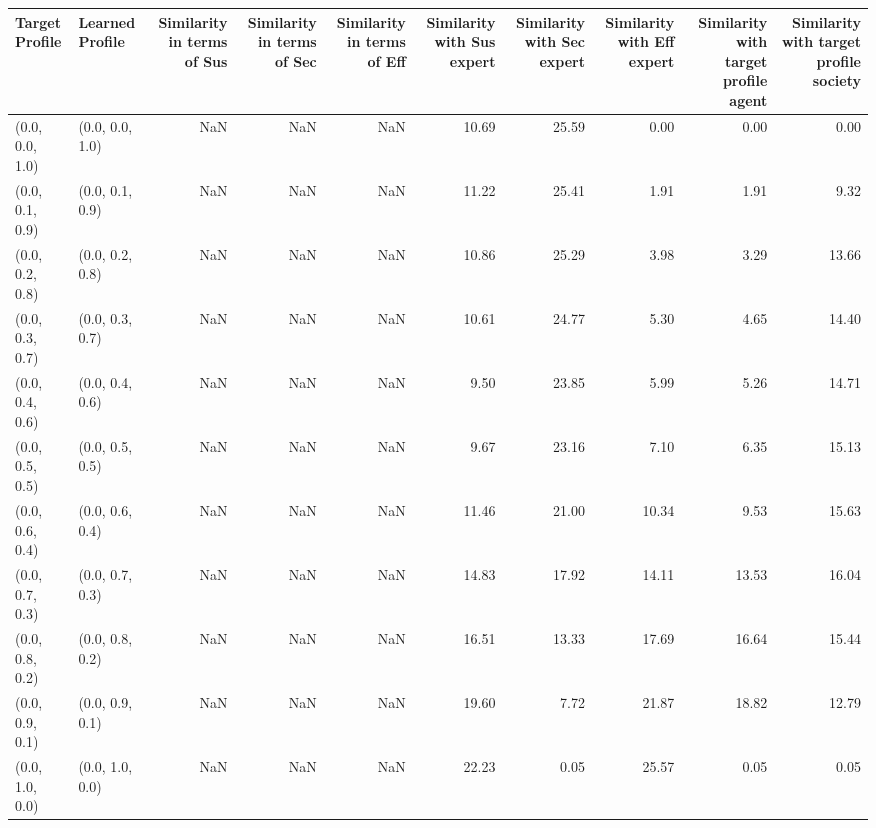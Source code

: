 \begin{tabular}{llrrrrrrrr}
\toprule
Target Profile & Learned Profile & Similarity in terms of Sus & Similarity in terms of Sec & Similarity in terms of Eff & Similarity with Sus expert & Similarity with Sec expert & Similarity with Eff expert & Similarity with target profile agent & Similarity with target profile society \\
\midrule
(0.0, 0.0, 1.0) & (0.0, 0.0, 1.0) & NaN & NaN & NaN & 10.69 & 25.59 & 0.00 & 0.00 & 0.00 \\
(0.0, 0.1, 0.9) & (0.0, 0.1, 0.9) & NaN & NaN & NaN & 11.22 & 25.41 & 1.91 & 1.91 & 9.32 \\
(0.0, 0.2, 0.8) & (0.0, 0.2, 0.8) & NaN & NaN & NaN & 10.86 & 25.29 & 3.98 & 3.29 & 13.66 \\
(0.0, 0.3, 0.7) & (0.0, 0.3, 0.7) & NaN & NaN & NaN & 10.61 & 24.77 & 5.30 & 4.65 & 14.40 \\
(0.0, 0.4, 0.6) & (0.0, 0.4, 0.6) & NaN & NaN & NaN & 9.50 & 23.85 & 5.99 & 5.26 & 14.71 \\
(0.0, 0.5, 0.5) & (0.0, 0.5, 0.5) & NaN & NaN & NaN & 9.67 & 23.16 & 7.10 & 6.35 & 15.13 \\
(0.0, 0.6, 0.4) & (0.0, 0.6, 0.4) & NaN & NaN & NaN & 11.46 & 21.00 & 10.34 & 9.53 & 15.63 \\
(0.0, 0.7, 0.3) & (0.0, 0.7, 0.3) & NaN & NaN & NaN & 14.83 & 17.92 & 14.11 & 13.53 & 16.04 \\
(0.0, 0.8, 0.2) & (0.0, 0.8, 0.2) & NaN & NaN & NaN & 16.51 & 13.33 & 17.69 & 16.64 & 15.44 \\
(0.0, 0.9, 0.1) & (0.0, 0.9, 0.1) & NaN & NaN & NaN & 19.60 & 7.72 & 21.87 & 18.82 & 12.79 \\
(0.0, 1.0, 0.0) & (0.0, 1.0, 0.0) & NaN & NaN & NaN & 22.23 & 0.05 & 25.57 & 0.05 & 0.05 \\
\bottomrule
\end{tabular}
